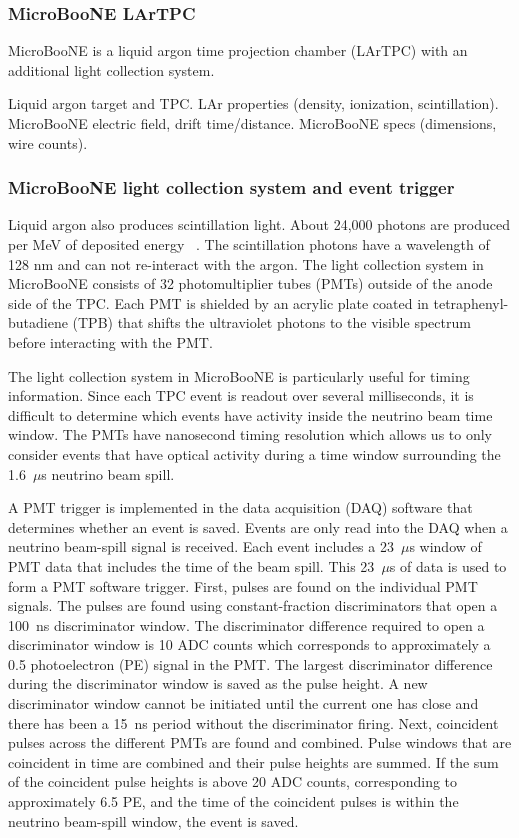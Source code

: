   \subsubsection{MicroBooNE LArTPC}\label{sec:lartpc}
    MicroBooNE is a liquid argon time projection chamber (LArTPC) with an
    additional light collection system.

    Liquid argon target and TPC.
    LAr properties (density, ionization, scintillation).
    MicroBooNE electric field, drift time/distance.
    MicroBooNE specs (dimensions, wire counts).

  \subsubsection{MicroBooNE light collection system and event trigger}\label{sec:swtrigger}
    Liquid argon also produces scintillation light. About 24,000 photons are
    produced per MeV of deposited energy ~\cite{detectorpaper}. The
    scintillation photons have a wavelength of 128 nm and can not re-interact
    with the argon. The light collection system in MicroBooNE consists of
    32 photomultiplier tubes (PMTs) outside of the anode side of the
    TPC. Each PMT is shielded by an acrylic plate coated in
    tetraphenyl-butadiene (TPB) that shifts the ultraviolet photons to the
    visible spectrum before interacting with the PMT.

    The light collection system in MicroBooNE is particularly useful for timing
    information. Since each TPC event is readout over several milliseconds, it
    is difficult to determine which events have activity inside the neutrino
    beam time window. The PMTs have nanosecond timing resolution which allows
    us to only consider events that have optical activity during a time window
    surrounding the 1.6~$\mu$s neutrino beam spill. 

    A PMT trigger is implemented in the data acquisition (DAQ) software that
    determines whether an event is saved. Events are only read into the DAQ
    when a neutrino beam-spill signal is received. Each event includes a
    23~$\mu$s window of PMT data that includes the time of the beam spill.
    This 23~$\mu$s of data is used to form a PMT software trigger. First,
    pulses are found on the individual PMT signals. The pulses are found using
    constant-fraction discriminators that open a 100~ns discriminator window.
    The discriminator difference required to open a discriminator window is 10
    ADC counts which corresponds to approximately a 0.5 photoelectron (PE)
    signal in the PMT. The largest discriminator difference during the
    discriminator window is saved as the pulse height. A new discriminator
    window cannot be initiated until the current one has close and there has
    been a 15~ns period without the discriminator firing.  Next, coincident
    pulses across the different PMTs are found and combined.  Pulse windows
    that are coincident in time are combined and their pulse heights are
    summed. If the sum of the coincident pulse heights is above 20 ADC counts,
    corresponding to approximately 6.5 PE, and the time of the coincident
    pulses is within the neutrino beam-spill window, the event is saved.


